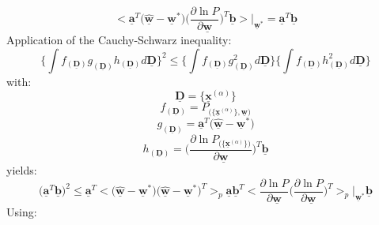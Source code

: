 \begin{equation}
	\Big< \underline{\mathbf{a}}^T \big(\hat{\underline{\mathbf{w}}} -
		\underline{\mathbf{w}}^* \big) 
		\Big( \frac{\partial \ln P}{\partial \underline{\mathbf{w}}}
		\Big)^T \underline{\mathbf{b}}
	\Big>\Big|_{\underline{\mathbf{w}}^*}
	= \underline{\mathbf{a}}^T \underline{\mathbf{b}}
\end{equation}
Application of the Cauchy-Schwarz inequality:
\begin{equation}
	\bigg\{ \int f_{(\underline{\mathbf{D}})} g_{(\underline{\mathbf{D}})}
		h_{(\underline{\mathbf{D}})} d \underline{\mathbf{D}}
	\bigg\}^2 \leq \bigg\{
		\int f_{(\underline{\mathbf{D}})} g_{(\underline{\mathbf{D}})}^2
		d \underline{\mathbf{D}}
	\bigg\} \bigg\{	
		\int f_{(\underline{\mathbf{D}})} h_{(\underline{\mathbf{D}})}^2
		d \underline{\mathbf{D}}
	\bigg\}
\end{equation}
with:
\[ \underline{\mathbf{D}} = \big\{\underline{\mathbf{x}}^{(\alpha)}\big\}
\]
\[ f_{(\underline{\mathbf{D}})} = P_{\big(\{\underline{\mathbf{x}}^{(\alpha)}\}
	, \underline{\mathbf{w}} \big)}
\]
\[ g_{(\underline{\mathbf{D}})} = \underline{\mathbf{a}}^T \big(
	\hat{\underline{\mathbf{w}}} - \underline{\mathbf{w}}^* \big)
\]
\[ h_{(\underline{\mathbf{D}})} = \Bigg(\frac{\partial \ln 
		P_{\big(\{\underline{\mathbf{x}}^{(\alpha)}\}\big)}}{
			\partial \underline{\mathbf{w}}}
	\Bigg)^T \underline{\mathbf{b}}
\]
yields:
\begin{equation}	
	\big( \underline{\mathbf{a}}^T \underline{\mathbf{b}} \big)^2
	\leq \underline{\mathbf{a}}^T \Big< \big( \hat{\underline{\mathbf{w}}}
		- \underline{\mathbf{w}}^* \big) 
	\big( \hat{\underline{\mathbf{w}}} - \underline{\mathbf{w}}^* \big)^T
	\Big>_p \underline{\mathbf{a}} \underline{\mathbf{b}}^T 
	\Big< \frac{\partial \ln P}{\partial \underline{\mathbf{w}}}
	  \Big( \frac{\partial \ln P}{\partial \underline{\mathbf{w}}} \Big)^T
	\Big>_p\bigg|_{\underline{\mathbf{w}}^*} \underline{\mathbf{b}}
\end{equation}
Using:
